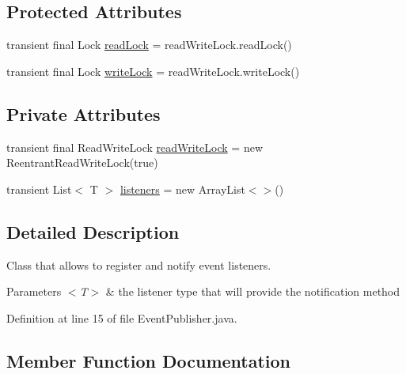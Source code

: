 \subsection*{Protected Attributes}
\begin{DoxyCompactItemize}
\item 
transient final Lock \mbox{\hyperlink{a00022_a9a0e9bb2169464a95ff912172496008d}{read\+Lock}} = read\+Write\+Lock.\+read\+Lock()
\item 
transient final Lock \mbox{\hyperlink{a00022_acde65c6b2ab5a8b71066b1fa20254cf7}{write\+Lock}} = read\+Write\+Lock.\+write\+Lock()
\end{DoxyCompactItemize}
\subsection*{Private Attributes}
\begin{DoxyCompactItemize}
\item 
transient final Read\+Write\+Lock \mbox{\hyperlink{a00022_a8acd43d374144fe2d44d67cd59e820fa}{read\+Write\+Lock}} = new Reentrant\+Read\+Write\+Lock(true)
\item 
transient List$<$ T $>$ \mbox{\hyperlink{a00022_a5f009aca2ca381c03151e765f5f8378e}{listeners}} = new Array\+List$<$$>$()
\end{DoxyCompactItemize}


\subsection{Detailed Description}
Class that allows to register and notify event listeners. 


\begin{DoxyParams}{Parameters}
{\em $<$\+T$>$} & the listener type that will provide the notification method \\
\hline
\end{DoxyParams}


Definition at line 15 of file Event\+Publisher.\+java.



\subsection{Member Function Documentation}
\mbox{\label{a00022_ad137b92c3d655d2e6cfd3349ffc41938}} 
